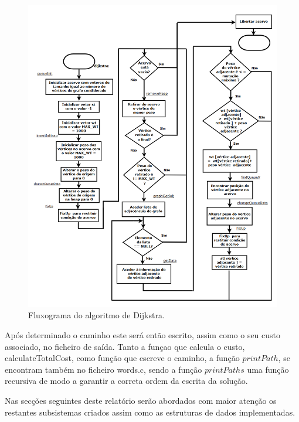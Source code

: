 \documentclass[a4paper, 11pt]{article}
\begin{document}
    
    \begin{figure}
        \includegraphics[width=\linewidth]{dijkstra.png}
        \caption{Fluxograma do algoritmo de Dijkstra. }
        \label{fig:flux3}
    \end{figure}
    
    \par Após determinado o caminho este será então escrito, assim como o seu custo associado, no ficheiro de saída. Tanto a funçao que calcula o custo, calculateTotalCost, como função que escreve o caminho, a função $printPath$, se encontram também no ficheiro words.c, sendo a função $printPaths$ uma função recursiva de modo a garantir a correta ordem da escrita da solução. 
	
	\par Nas secções seguintes deste relatório serão abordados com maior atenção os restantes subsistemas criados assim como as estruturas de dados implementadas.
    
\end{document}
